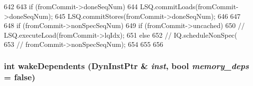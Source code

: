 \begin{DoxyCode}
642 {
643     if (fromCommit->doneSeqNum) {
644         LSQ.commitLoads(fromCommit->doneSeqNum);
645         LSQ.commitStores(fromCommit->doneSeqNum);
646     }
647 
648     if (fromCommit->nonSpecSeqNum) {
649         if (fromCommit->uncached) {
650 //            LSQ.executeLoad(fromCommit->lqIdx);
651         } else {
652 //            IQ.scheduleNonSpec(
653 //                fromCommit->nonSpecSeqNum);
654         }
655     }
656 }
\end{DoxyCode}
\hypertarget{classLWBackEnd_a044f74c5b9426d9738e2d015395a3e72}{
\subsubsection[{wakeDependents}]{\setlength{\rightskip}{0pt plus 5cm}int wakeDependents ({\bf DynInstPtr} \& {\em inst}, \/  bool {\em memory\_\-deps} = {\ttfamily false})}}
\label{classLWBackEnd_a044f74c5b9426d9738e2d015395a3e72}



